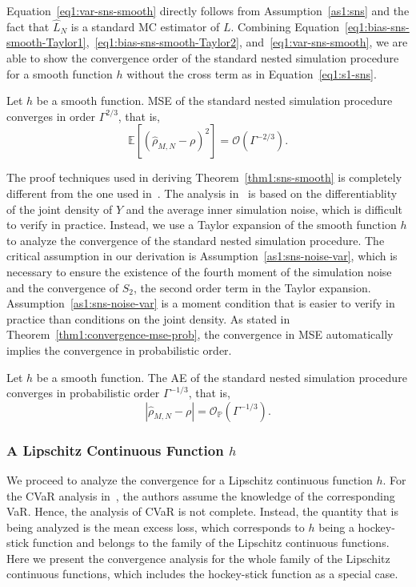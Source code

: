 Equation~\ref{eq1:var-sns-smooth} directly follows from Assumption~\ref{as1:sns} and the fact that $\hat{L}_N$ is a standard MC estimator of $L$.
Combining Equation~\ref{eq1:bias-sns-smooth-Taylor1},~\ref{eq1:bias-sns-smooth-Taylor2}, and~\ref{eq1:var-sns-smooth}, we are able to show the convergence order of the standard nested simulation procedure for a smooth function $h$ without the cross term as in Equation~\ref{eq1:s1-sns}.

\begin{theorem} \label{thm1:sns-smooth}
    Let $h$ be a smooth function. 
    MSE of the standard nested simulation procedure converges in order $\Gamma^{2/3}$, that is,
    $$\mathbb{E} \left[ \left( \hat{\rho}_{M, N} - \rho \right)^2 \right] = \mathcal{O}(\Gamma^{-2/3}).$$
\end{theorem}

The proof techniques used in deriving Theorem~\ref{thm1:sns-smooth} is completely different from the one used in~\cite{gordy2010nested}.
The analysis in~\cite{gordy2010nested} is based on the differentiablity of the joint density of $Y$ and the average inner simulation noise, which is difficult to verify in practice.
Instead, we use a Taylor expansion of the smooth function $h$ to analyze the convergence of the standard nested simulation procedure.
The critical assumption in our derivation is Assumption~\ref{as1:sns-noise-var}, which is necessary to ensure the existence of the fourth moment of the simulation noise and the convergence of $S_2$, the second order term in the Taylor expansion.
Assumption~\ref{as1:sns-noise-var} is a moment condition that is easier to verify in practice than conditions on the joint density.
As stated in Theorem~\ref{thm1:convergence-mse-prob}, the convergence in MSE automatically implies the convergence in probabilistic order.

\begin{corollary}
    Let $h$ be a smooth function. 
    The AE of the standard nested simulation procedure converges in probabilistic order $\Gamma^{-1/3}$, that is,
    $$\left| \hat{\rho}_{M, N} - \rho \right| = \mathcal{O}_\mathbb{P}(\Gamma^{-1/3}).$$
\end{corollary}

\subsubsection*{A Lipschitz Continuous Function $h$}
We proceed to analyze the convergence for a Lipschitz continuous function $h$.
For the CVaR analysis in~\cite{gordy2010nested}, the authors assume the knowledge of the corresponding VaR.
Hence, the analysis of CVaR is not complete.
Instead, the quantity that is being analyzed is the mean excess loss, which corresponds to $h$ being a hockey-stick function and belongs to the family of the Lipschitz continuous functions. 
Here we present the convergence analysis for the whole family of the Lipschitz continuous functions, which includes the hockey-stick function as a special case. 

